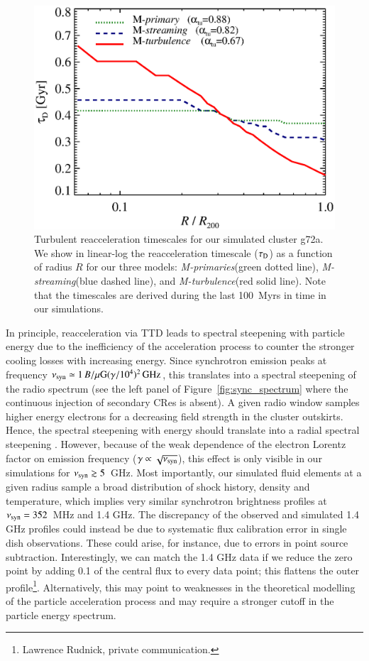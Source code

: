 \documentclass[fleqn,usenatbib,useAMS]{mnras}
\newcommand{\Mstream}{{\it M-streaming}\xspace}
\newcommand{\Mflatturb}{{\it M-turbulence}\xspace}
\newcommand{\Mprimary}{{\it M-primaries}\xspace}
\begin{document}
\begin{figure}
  \includegraphics[width=1.0\columnwidth]{tau_reacc.eps}
  \caption{Turbulent reacceleration timescales for our simulated
    cluster g72a. We show in linear-log the reacceleration timescale
    ($\tau_{\rm D}$) as a function of radius $R$ for our three models:
    \Mprimary (green dotted line), \Mstream (blue dashed line), and
    \Mflatturb (red solid line). Note that the timescales are derived
    during the last 100~Myrs in time in our simulations.}
  \label{fig:tauD}
\end{figure}

In principle, reacceleration via TTD leads to spectral steepening with
particle energy due to the inefficiency of the acceleration process to
counter the stronger cooling losses with increasing energy. Since
synchrotron emission peaks at frequency $\nu_{\mathrm{syn}}\simeq 1\,
B/\mu{\mathrm{G}} (\gamma/10^4)^2\,{\mathrm{GHz}}$, this translates into a
spectral steepening of the radio spectrum (see the left panel of
Figure~\ref{fig:sync_spectrum} where the continuous injection of
secondary CRes is absent). A given radio window samples higher energy
electrons for a decreasing field strength in the cluster
outskirts. Hence, the spectral steepening with energy should translate
into a radial spectral steepening \citep{brunetti12}. However, because
of the weak dependence of the electron Lorentz factor on emission
frequency ($\gamma\propto\sqrt{\nu_{\mathrm{syn}}}$), this effect is only
visible in our simulations for $\nu_{\mathrm{syn}}\gtrsim5$~GHz. Most
importantly, our simulated fluid elements at a given radius sample a
broad distribution of shock history, density and temperature, which
implies very similar synchrotron brightness profiles at
$\nu_{\mathrm{syn}}=352$~MHz and 1.4 GHz. The discrepancy of the observed
and simulated 1.4 GHz profiles could instead be due to systematic flux
calibration error in single dish observations. These could arise, for
instance, due to errors in point source subtraction. Interestingly, we
can match the 1.4 GHz data if we reduce the zero point by adding 0.1
of the central flux to every data point; this flattens the outer
profile\footnote{Lawrence Rudnick, private communication.}.
Alternatively, this may point to weaknesses in the theoretical
modelling of the particle acceleration process and may require a
stronger cutoff in the particle energy spectrum.
\end{document}

